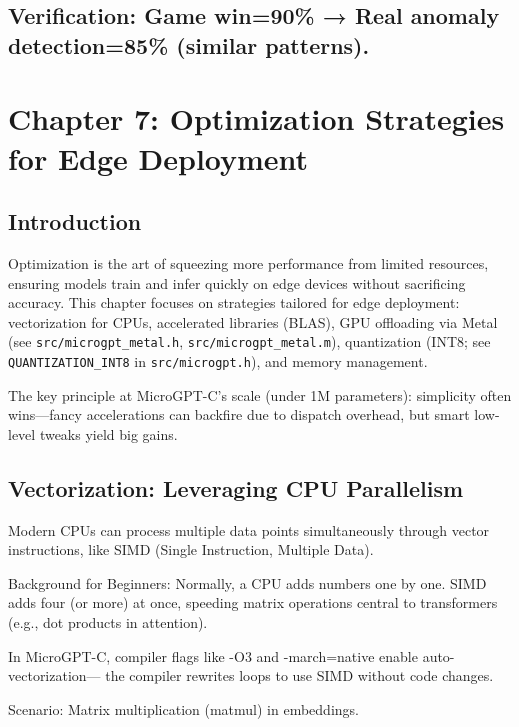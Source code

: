 \documentclass[
]{article}
\begin{document}
\subsection{Verification: Game win=90\% → Real anomaly detection=85\%
(similar
patterns).}\label{verification-game-win90-real-anomaly-detection85-similar-patterns.}

\section{Chapter 7: Optimization Strategies for Edge
Deployment}\label{chapter-7-optimization-strategies-for-edge-deployment}

\subsection{Introduction}\label{introduction-6}

Optimization is the art of squeezing more performance from limited
resources, ensuring models train and infer quickly on edge devices
without sacrificing accuracy. This chapter focuses on strategies
tailored for edge deployment: vectorization for CPUs, accelerated
libraries (BLAS), GPU offloading via Metal (see
\texttt{src/microgpt\_metal.h}, \texttt{src/microgpt\_metal.m}),
quantization (INT8; see \texttt{QUANTIZATION\_INT8} in
\texttt{src/microgpt.h}), and memory management.

The key principle at MicroGPT-C's scale (under 1M parameters):
simplicity often wins---fancy accelerations can backfire due to dispatch
overhead, but smart low-level tweaks yield big gains.

\subsection{Vectorization: Leveraging CPU
Parallelism}\label{vectorization-leveraging-cpu-parallelism}

Modern CPUs can process multiple data points simultaneously through
vector instructions, like SIMD (Single Instruction, Multiple Data).

Background for Beginners: Normally, a CPU adds numbers one by one. SIMD
adds four (or more) at once, speeding matrix operations central to
transformers (e.g., dot products in attention).

In MicroGPT-C, compiler flags like -O3 and -march=native enable
auto-vectorization--- the compiler rewrites loops to use SIMD without
code changes.

Scenario: Matrix multiplication (matmul) in embeddings.
\end{document}
